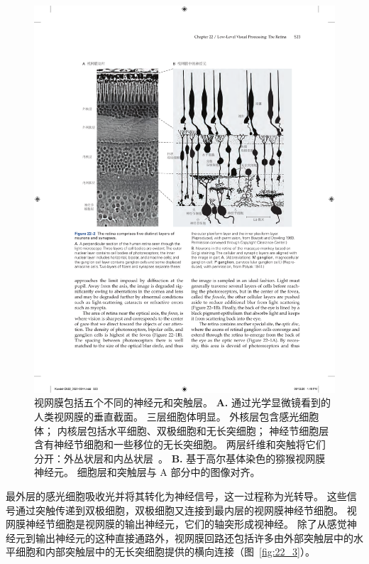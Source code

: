 \begin{figure}[htbp]
	\centering
	\includegraphics[width=1.0\linewidth]{chap22/fig_22_2}
	\caption{视网膜包括五个不同的神经元和突触层。
		\textbf{A.} 通过光学显微镜看到的人类视网膜的垂直截面。
		三层细胞体明显。
		外核层包含感光细胞体； 内核层包括水平细胞、双极细胞和无长突细胞； 神经节细胞层含有神经节细胞和一些移位的无长突细胞。
		两层纤维和突触将它们分开：外丛状层和内丛状层~\cite{boycott1969organization}。
		\textbf{B.} 基于高尔基体染色的猕猴视网膜神经元。
		细胞层和突触层与 A 部分中的图像对齐\cite{polyak1941retina}。}
	\label{fig:22_2}
\end{figure}


最外层的感光细胞吸收光并将其转化为神经信号，这一过程称为光转导。
这些信号通过突触传递到双极细胞，双极细胞又连接到最内层的视网膜神经节细胞。
视网膜神经节细胞是视网膜的输出神经元，它们的轴突形成视神经。
除了从感觉神经元到输出神经元的这种直接通路外，视网膜回路还包括许多由外部突触层中的水平细胞和内部突触层中的无长突细胞提供的横向连接（图~\ref{fig:22_3}）。


